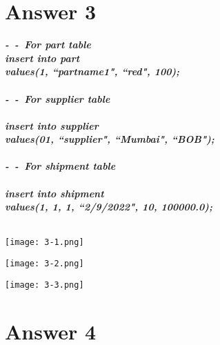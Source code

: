 \documentclass[14pt]{extarticle}
\begin{document}
\section*{Answer 3}
\textbf{\textit{
-\ -\ For part table \\
insert into part \\
values(1, ``partname1", ``red", 100); \\
\\
-\ -\ For supplier table \\
\\
insert into supplier\\
values(01, ``supplier", ``Mumbai", ``BOB"); \\
\\
-\ -\ For shipment table \\
\\
insert into shipment \\
values(1, 1, 1, ``2/9/2022", 10, 100000.0);\\
}}\\

\begin{center}
    \texttt{[image: 3-1.png]}
\end{center}
\begin{center}
    \texttt{[image: 3-2.png]}
\end{center}
\begin{center}
    \texttt{[image: 3-3.png]}
\end{center}

\newpage
\section*{Answer 4}
\end{document}
